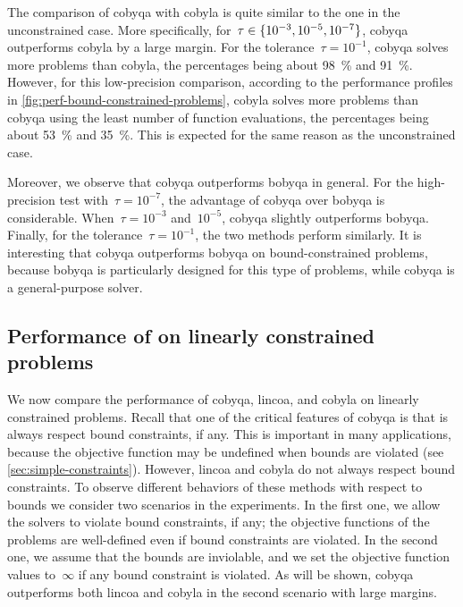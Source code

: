 The comparison of \gls{cobyqa} with \gls{cobyla} is quite similar to the one in the unconstrained case.
More specifically, for~$\tau \in \{10^{-3}, 10^{-5}, 10^{-7}\}$, \gls{cobyqa} outperforms \gls{cobyla} by a large margin.
For the tolerance~$\tau = 10^{-1}$, \gls{cobyqa} solves more problems than \gls{cobyla}, the percentages being about \SI{98}{\percent} and \SI{91}{\percent}.
However, for this low-precision comparison, according to the performance profiles in \cref{fig:perf-bound-constrained-problems}, \gls{cobyla} solves more problems than \gls{cobyqa} using the least number of function evaluations, the percentages being about \SI{53}{\percent} and \SI{35}{\percent}.
This is expected for the same reason as the unconstrained case.

Moreover, we observe that \gls{cobyqa} outperforms \gls{bobyqa} in general.
For the high-precision test with~$\tau = 10^{-7}$, the advantage of \gls{cobyqa} over \gls{bobyqa} is considerable.
When~$\tau = 10^{-3}$ and~$10^{-5}$, \gls{cobyqa} slightly outperforms \gls{bobyqa}.
Finally, for the tolerance~$\tau = 10^{-1}$, the two methods perform similarly.
It is interesting that \gls{cobyqa} outperforms \gls{bobyqa} on bound-constrained problems, because \gls{bobyqa} is particularly designed for this type of problems, while \gls{cobyqa} is a general-purpose solver.

\subsection{Performance of  on linearly constrained problems}
\label{subsec:comparison-cobyqa-lincoa}

We now compare the performance of \gls{cobyqa}, \gls{lincoa}, and \gls{cobyla} on linearly constrained problems.
Recall that one of the critical features of \gls{cobyqa} is that is always respect bound constraints, if any.
This is important in many applications, because the objective function may be undefined when bounds are violated (see \cref{sec:simple-constraints}).
However, \gls{lincoa} and \gls{cobyla} do not always respect bound constraints.
To observe different behaviors of these methods with respect to bounds we consider two scenarios in the experiments.
In the first one, we allow the solvers to violate bound constraints, if any; the objective functions of the problems are well-defined even if bound constraints are violated.
In the second one, we assume that the bounds are inviolable, and we set the objective function values to~$\infty$ if any bound constraint is violated.
As will be shown, \gls{cobyqa} outperforms both \gls{lincoa} and \gls{cobyla} in the second scenario with large margins.

